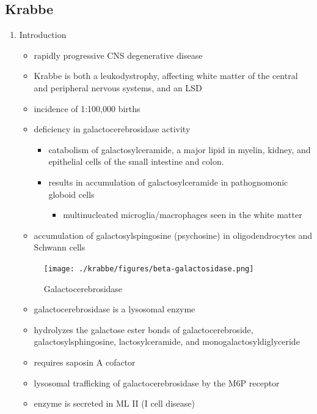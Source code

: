 \documentclass{scrartcl}
\begin{document}
\subsection{Krabbe}
\label{sec:org24f85dc}
\begin{enumerate}
\item Introduction
\label{sec:org5ce66cb}
\begin{itemize}
\item rapidly progressive CNS degenerative disease
\item Krabbe is both a leukodystrophy, affecting white matter of the central
and peripheral nervous systems, and an LSD

\item incidence of 1:100,000 births
\item deficiency in galactocerebrosidase activity
\begin{itemize}
\item catabolism of galactosylceramide, a major lipid in myelin, kidney, and epithelial cells of the small intestine and colon.
\item results in accumulation of galactosylceramide in pathognomonic globoid cells
\begin{itemize}
\item multinucleated microglia/macrophages seen in the white matter
\end{itemize}
\end{itemize}
\item accumulation of galactosylspingosine (psychosine) in oligodendrocytes and Schwann cells
\end{itemize}

\begin{figure}[htbp]
\centering
\texttt{[image: ./krabbe/figures/beta-galactosidase.png]}
\caption{\label{fig:org7fea6b1}
Galactocerebrosidase}
\end{figure}

\begin{itemize}
\item galactocerebrosidase is a lysosomal enzyme
\item hydrolyzes the galactose ester bonds of galactocerebroside, galactosylsphingosine, lactosylceramide, and monogalactosyldiglyceride
\item requires saposin A cofactor
\item lysosomal trafficking of galactocerebrosidase by the M6P receptor
\item enzyme is secreted in ML II (I cell disease)
\end{itemize}


\end{enumerate}
\end{document}
